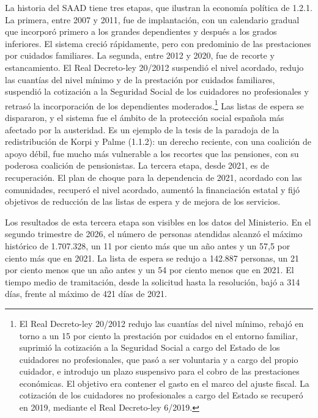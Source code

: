 \documentclass[10pt,a4paper]{article}
\begin{document}
La historia del SAAD tiene tres etapas, que ilustran la economía política de 1.2.1. La primera, entre 2007 y 2011, fue de implantación, con un calendario gradual que incorporó primero a los grandes dependientes y después a los grados inferiores. El sistema creció rápidamente, pero con predominio de las prestaciones por cuidados familiares. La segunda, entre 2012 y 2020, fue de recorte y estancamiento. El Real Decreto-ley 20/2012 suspendió el nivel acordado, redujo las cuantías del nivel mínimo y de la prestación por cuidados familiares, suspendió la cotización a la Seguridad Social de los cuidadores no profesionales y retrasó la incorporación de los dependientes moderados.\footnote{El Real Decreto-ley 20/2012 redujo las cuantías del nivel mínimo, rebajó en torno a un 15 por ciento la prestación por cuidados en el entorno familiar, suprimió la cotización a la Seguridad Social a cargo del Estado de los cuidadores no profesionales, que pasó a ser voluntaria y a cargo del propio cuidador, e introdujo un plazo suspensivo para el cobro de las prestaciones económicas. El objetivo era contener el gasto en el marco del ajuste fiscal. La cotización de los cuidadores no profesionales a cargo del Estado se recuperó en 2019, mediante el Real Decreto-ley 6/2019.
} Las listas de espera se dispararon, y el sistema fue el ámbito de la protección social española más afectado por la austeridad. Es un ejemplo de la tesis de la paradoja de la redistribución de Korpi y Palme (1.1.2): un derecho reciente, con una coalición de apoyo débil, fue mucho más vulnerable a los recortes que las pensiones, con su poderosa coalición de pensionistas. La tercera etapa, desde 2021, es de recuperación. El plan de choque para la dependencia de 2021, acordado con las comunidades, recuperó el nivel acordado, aumentó la financiación estatal y fijó objetivos de reducción de las listas de espera y de mejora de los servicios.

Los resultados de esta tercera etapa son visibles en los datos del Ministerio. En el segundo trimestre de 2026, el número de personas atendidas alcanzó el máximo histórico de 1.707.328, un 11 por ciento más que un año antes y un 57,5 por ciento más que en 2021. La lista de espera se redujo a 142.887 personas, un 21 por ciento menos que un año antes y un 54 por ciento menos que en 2021. El tiempo medio de tramitación, desde la solicitud hasta la resolución, bajó a 314 días, frente al máximo de 421 días de 2021.
\end{document}
